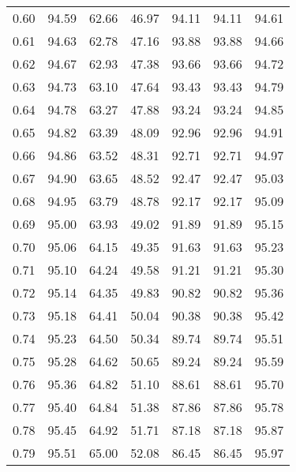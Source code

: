 \begin{tabular}{|c|c|c|c|c|c|c|}
      0.60 &     94.59 &     62.66 &      46.97 &   94.11 &      94.11 &         94.61 \\
      0.61 &     94.63 &     62.78 &      47.16 &   93.88 &      93.88 &         94.66 \\
      0.62 &     94.67 &     62.93 &      47.38 &   93.66 &      93.66 &         94.72 \\
      0.63 &     94.73 &     63.10 &      47.64 &   93.43 &      93.43 &         94.79 \\
      0.64 &     94.78 &     63.27 &      47.88 &   93.24 &      93.24 &         94.85 \\
      0.65 &     94.82 &     63.39 &      48.09 &   92.96 &      92.96 &         94.91 \\
      0.66 &     94.86 &     63.52 &      48.31 &   92.71 &      92.71 &         94.97 \\
      0.67 &     94.90 &     63.65 &      48.52 &   92.47 &      92.47 &         95.03 \\
      0.68 &     94.95 &     63.79 &      48.78 &   92.17 &      92.17 &         95.09 \\
      0.69 &     95.00 &     63.93 &      49.02 &   91.89 &      91.89 &         95.15 \\
      0.70 &     95.06 &     64.15 &      49.35 &   91.63 &      91.63 &         95.23 \\
      0.71 &     95.10 &     64.24 &      49.58 &   91.21 &      91.21 &         95.30 \\
      0.72 &     95.14 &     64.35 &      49.83 &   90.82 &      90.82 &         95.36 \\
      0.73 &     95.18 &     64.41 &      50.04 &   90.38 &      90.38 &         95.42 \\
      0.74 &     95.23 &     64.50 &      50.34 &   89.74 &      89.74 &         95.51 \\
      0.75 &     95.28 &     64.62 &      50.65 &   89.24 &      89.24 &         95.59 \\
      0.76 &     95.36 &     64.82 &      51.10 &   88.61 &      88.61 &         95.70 \\
      0.77 &     95.40 &     64.84 &      51.38 &   87.86 &      87.86 &         95.78 \\
      0.78 &     95.45 &     64.92 &      51.71 &   87.18 &      87.18 &         95.87 \\
      0.79 &     95.51 &     65.00 &      52.08 &   86.45 &      86.45 &         95.97 \\

\end{tabular}
